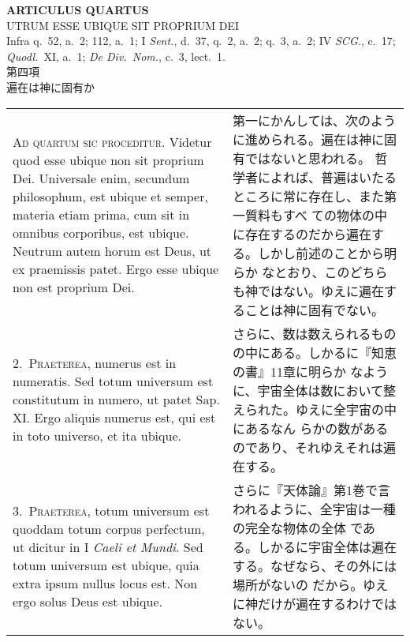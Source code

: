 \documentclass[10pt]{jsarticle} %
\begin{document}
\begin{center}
 {\Large {\bf ARTICULUS QUARTUS}}\\
 {\large UTRUM ESSE UBIQUE SIT PROPRIUM DEI}\\
 {\footnotesize Infra q.~52, a.~2; 112, a.~1; I {\itshape Sent.}, d.~37,
 q.~2, a.~2; q.~3, a.~2; IV {\itshape SCG.}, c.~17; {\itshape
 Quodl.}~XI, a.~1; {\itshape De Div.~Nom.}, c.~3, lect.~1.}\\
 {\Large 第四項\\遍在は神に固有か}
\end{center}

\begin{longtable}{p{21em}p{21em}}

{\huge A}{\scshape d quartum sic proceditur}. Videtur quod esse ubique non sit
 proprium Dei. Universale enim, secundum philosophum, est ubique et
 semper, materia etiam prima, cum sit in omnibus corporibus, est
 ubique. Neutrum autem horum est Deus, ut ex praemissis patet. Ergo esse
 ubique non est proprium Dei.

&

第一にかんしては、次のように進められる。遍在は神に固有ではないと思われる。
 哲学者によれば、普遍はいたるところに常に存在し、また第一質料もすべ
 ての物体の中に存在するのだから遍在する。しかし前述のことから明らか
 なとおり、このどちらも神ではない。ゆえに遍在することは神に固有でない。

\\


2.~{\scshape Praeterea}, numerus est in numeratis. Sed totum universum est
 constitutum in numero, ut patet Sap. XI. Ergo aliquis numerus est, qui
 est in toto universo, et ita ubique.

&

さらに、数は数えられるものの中にある。しかるに『知恵の書』11章に明らか
 なように、宇宙全体は数において整えられた。ゆえに全宇宙の中にあるなん
 らかの数があるのであり、それゆえそれは遍在する。

\\


3.~{\scshape Praeterea}, totum universum est quoddam totum corpus
 perfectum, ut dicitur in I {\itshape Caeli et Mundi}. Sed totum
 universum est ubique, quia extra ipsum nullus locus est. Non ergo solus
 Deus est ubique.

&

さらに『天体論』第1巻で言われるように、全宇宙は一種の完全な物体の全体
 である。しかるに宇宙全体は遍在する。なぜなら、その外には場所がないの
 だから。ゆえに神だけが遍在するわけではない。


\end{longtable}
\end{document}
